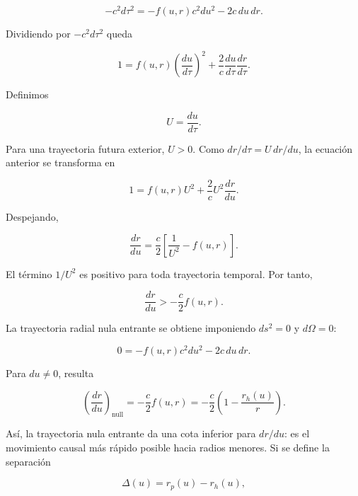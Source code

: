 \documentclass[
aps,
prd,
reprint,
superscriptaddress,
nofootinbib,
amsmath,
amssymb
]{revtex4-2}
\begin{document}
\begin{equation}
-c^2d\tau^2
=
-
f(u,r)c^2du^2
-2c\,du\,dr.
\end{equation}

Dividiendo por $-c^2d\tau^2$ queda

\begin{equation}
1=
f(u,r)
\left(
\frac{du}{d\tau}
\right)^2
+
\frac{2}{c}
\frac{du}{d\tau}
\frac{dr}{d\tau}.
\end{equation}

Definimos

\begin{equation}
U=
\frac{du}{d\tau}.
\end{equation}

Para una trayectoria futura exterior, $U>0$. Como $dr/d\tau=U\,dr/du$, la ecuación anterior se transforma en

\begin{equation}
1=
f(u,r)U^2
+
\frac{2}{c}
U^2
\frac{dr}{du}.
\end{equation}

Despejando,

\begin{equation}
\frac{dr}{du}
=
\frac{c}{2}
\left[
\frac{1}{U^2}
-
f(u,r)
\right].
\end{equation}

El término $1/U^2$ es positivo para toda trayectoria temporal. Por tanto,

\begin{equation}
\frac{dr}{du}
>
-
\frac{c}{2}
f(u,r).
\label{eqAppendixTimelikeBound}
\end{equation}

La trayectoria radial nula entrante se obtiene imponiendo $ds^2=0$ y $d\Omega=0$:

\begin{equation}
0=
-
f(u,r)c^2du^2
-2c\,du\,dr.
\end{equation}

Para $du\neq0$, resulta

\begin{equation}
\left(
\frac{dr}{du}
\right)_{\mathrm{null}}
=
-
\frac{c}{2}
f(u,r)
=
-
\frac{c}{2}
\left(
1-\frac{r_h(u)}{r}
\right).
\label{eqAppendixNull}
\end{equation}

Así, la trayectoria nula entrante da una cota inferior para $dr/du$: es el movimiento causal más rápido posible hacia radios menores. Si se define la separación

\begin{equation}
\Delta(u)=
r_p(u)-r_h(u),
\end{equation}
\end{document}
